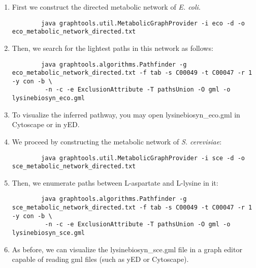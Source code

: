 \begin{enumerate}

\item First we construct the directed metabolic network of \textit{E. coli}.

        {\color{Blue} \begin{footnotesize}
		\begin{verbatim}
		java graphtools.util.MetabolicGraphProvider -i eco -d -o eco_metabolic_network_directed.txt
		\end{verbatim} \end{footnotesize}
		}

\item Then, we search for the lightest paths in this network as follows:

		{\color{Blue} \begin{footnotesize}
		\begin{verbatim}
		java graphtools.algorithms.Pathfinder -g eco_metabolic_network_directed.txt -f tab -s C00049 -t C00047 -r 1 -y con -b \
		 -n -c -e ExclusionAttribute -T pathsUnion -O gml -o lysinebiosyn_eco.gml
		\end{verbatim} \end{footnotesize}
		}

\item To visualize the inferred pathway, you may open lysinebiosyn_eco.gml in Cytoscape or in yED.


\item We proceed by constructing the metabolic network of \textit{S. cerevisiae}:

	 {\color{Blue} \begin{footnotesize}
		\begin{verbatim}
		java graphtools.util.MetabolicGraphProvider -i sce -d -o sce_metabolic_network_directed.txt
		\end{verbatim} \end{footnotesize}
		}

\item Then, we enumerate paths between L-aspartate and L-lysine in it:

		{\color{Blue} \begin{footnotesize}
		\begin{verbatim}
		java graphtools.algorithms.Pathfinder -g sce_metabolic_network_directed.txt -f tab -s C00049 -t C00047 -r 1 -y con -b \
		 -n -c -e ExclusionAttribute -T pathsUnion -O gml -o lysinebiosyn_sce.gml
		\end{verbatim} \end{footnotesize}
		}

\item As before, we can visualize the lysinebiosyn_sce.gml file in a graph editor capable of reading gml files
     (such as yED or Cytoscape).

\end{enumerate}

